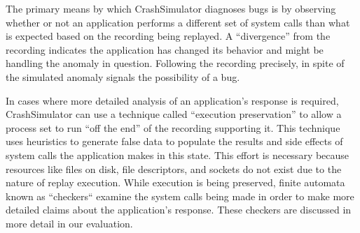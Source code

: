 The primary means by which
CrashSimulator diagnoses bugs is
by observing whether or not an application
performs a different set of system calls than what is expected based on the
recording being replayed.  A ``divergence'' from the recording indicates
the application has changed its behavior and might be handling
the anomaly in question.  Following the recording precisely, in spite of
the simulated anomaly signals the possibility of a bug.

In cases where more detailed analysis of an application's response
is required, CrashSimulator can use a
technique called ``execution preservation'' to allow a process set to run
``off the end'' of the recording supporting it.  This technique uses
heuristics to generate false data to populate the results and
side effects of system calls the application makes in this state.  This
effort is necessary because resources like files on disk, file descriptors,
and sockets do not exist due to the nature of replay execution.  While
execution is being preserved, finite automata known as ``checkers`` examine
the system calls being made in order to make more detailed claims about the
application's response.  These checkers are discussed in more detail in our
evaluation.
